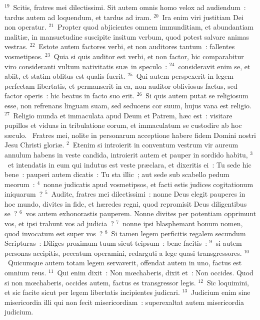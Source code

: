 ${}^{19}$~Scitis, fratres mei dilectissimi. Sit autem omnis homo velox ad audiendum~: tardus autem ad loquendum, et tardus ad iram.
${}^{20}$~Ira enim viri justitiam Dei non operatur.
${}^{21}$~Propter quod abjicientes omnem immunditiam, et abundantiam maliti\ae , in mansuetudine suscipite insitum verbum, quod potest salvare animas vestras.
${}^{22}$~Estote autem factores verbi, et non auditores tantum~: fallentes vosmetipsos.
${}^{23}$~Quia si quis auditor est verbi, et non factor, hic comparabitur viro consideranti vultum nativitatis su\ae\ in speculo~:
${}^{24}$~consideravit enim se, et abiit, et statim oblitus est qualis fuerit.
${}^{25}$~Qui autem perspexerit in legem perfectam libertatis, et permanserit in ea, non auditor obliviosus factus, sed factor operis~: hic beatus in facto suo erit.
${}^{26}$~Si quis autem putat se religiosum esse, non refrenans linguam suam, sed seducens cor suum, hujus vana est religio.
${}^{27}$~Religio munda et immaculata apud Deum et Patrem, h\ae c est~: visitare pupillos et viduas in tribulatione eorum, et immaculatum se custodire ab hoc s\ae culo.
~\lettrine[lines=10,image=true,loversize=0.05,lraise=-0.03]{F}{}ratres mei, nolite in personarum acceptione habere fidem Domini nostri Jesu Christi glori\ae .
${}^{2}$~Etenim si introierit in conventum vestrum vir aureum annulum habens in veste candida, introierit autem et pauper in sordido habitu,
${}^{3}$~et intendatis in eum qui indutus est veste pr\ae clara, et dixeritis ei~: Tu sede hic bene~: pauperi autem dicatis~: Tu sta illic~; aut sede sub scabello pedum meorum~:
${}^{4}$~nonne judicatis apud vosmetipsos, et facti estis judices cogitationum iniquarum~?
${}^{5}$~Audite, fratres mei dilectissimi~: nonne Deus elegit pauperes in hoc mundo, divites in fide, et h\ae redes regni, quod repromisit Deus diligentibus se~?
${}^{6}$~vos autem exhonorastis pauperem. Nonne divites per potentiam opprimunt vos, et ipsi trahunt vos ad judicia~?
${}^{7}$~nonne ipsi blasphemant bonum nomen, quod invocatum est super vos~?
${}^{8}$~Si tamen legem perficitis regalem secundum Scripturas~: Diliges proximum tuum sicut teipsum~: bene facitis~:
${}^{9}$~si autem personas accipitis, peccatum operamini, redarguti a lege quasi transgressores.
${}^{10}$~Quicumque autem totam legem servaverit, offendat autem in uno, factus est omnium reus.
${}^{11}$~Qui enim dixit~: Non mœchaberis, dixit et~: Non occides. Quod si non mœchaberis, occides autem, factus es transgressor legis.
${}^{12}$~Sic loquimini, et sic facite sicut per legem libertatis incipientes judicari.
${}^{13}$~Judicium enim sine misericordia illi qui non fecit misericordiam~: superexaltat autem misericordia judicium.


